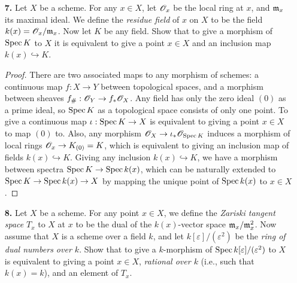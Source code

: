 \documentclass{article}
\begin{document}
\begin{enumerate} [label=\textbf{\arabic*.}, leftmargin=0em]
\item[\textbf{7.}] Let $X$ be a scheme. For any $x \in X$, let $\mathscr{O}_x$ be the local ring at $x$, and $\mathfrak{m}_x$ its maximal ideal. We define the \textit{residue field} of $x$ on $X$ to be the field $k(x) = \mathscr{O}_x / \mathfrak{m}_x$. Now let $K$ be any field. Show that to give a morphism of $\operatorname{Spec}{K}$ to $X$ it is equivalent to give a point $x \in X$ and an inclusion map $k(x) \hookrightarrow K$.

\begin{proof}
    There are two associated maps to any morphism of schemes: a continuous map $f: X \to Y$ between topological spaces, and a morphism between sheaves $f_\# : \mathscr{O}_Y \to f_* \mathscr{O}_X$. Any field has only the zero ideal $(0)$ as a prime ideal, so $\operatorname{Spec}{K}$ as a topological space consists of only one point. To give a continuous map $\iota : \operatorname{Spec}{K} \to X$ is equivalent to giving a point $x \in X$ to map $(0)$ to. Also, any morphism $\mathscr{O}_X \to \iota_* \mathscr{O}_{\operatorname{Spec}{K}}$ induces a morphism of local rings $\mathscr{O}_x \to K_{(0)} = K$, which is equivalent to giving an inclusion map of fields $k(x) \hookrightarrow K$. Giving any inclusion $k(x) \hookrightarrow K$, we have a morphism between spectra $\operatorname{Spec}{K} \to \operatorname{Spec}{k(x)}$, which can be naturally extended to $\operatorname{Spec}{K} \to \operatorname{Spec}{k(x)} \to X$ by mapping the unique point of $\operatorname{Spec}{k(x)}$ to $x \in X$.
\end{proof}

\item[\textbf{8.}] Let $X$ be a scheme. For any point $x \in X$, we define the \textit{Zariski tangent space} $T_x$ to $X$ at $x$ to be the dual of the $k(x)$-vector space $\mathfrak{m}_x / \mathfrak{m}_x^2$. Now assume that $X$ is a scheme over a field $k$, and let $k[\varepsilon] / (\varepsilon^2)$ be the \textit{ring of dual numbers over $k$}. Show that to give a $k$-morphism of $\operatorname{Spec}{k[\varepsilon] / (\varepsilon^2)}$ to $X$ is equivalent to giving a point $x \in X$, \textit{rational over $k$} (i.e., such that $k(x) = k$), and an element of $T_x$.


\end{enumerate}
\end{document}
